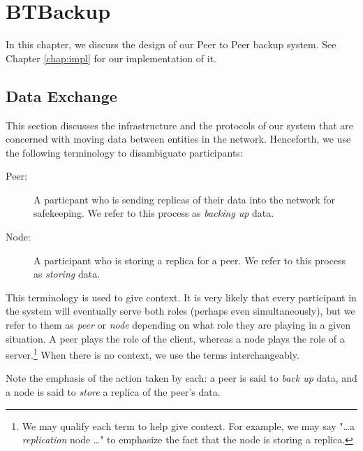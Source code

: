 \documentclass[12pt]{report}
\begin{document}
\chapter{BTBackup}

In this chapter, we discuss the design of our Peer to Peer backup system. See Chapter \ref{chap:impl} for our implementation of it.

\section{Data Exchange} \label{sec:DataExchange}

This section discusses the infrastructure and the protocols of our system that are concerned with moving data between entities in the network. Henceforth, we use the following terminology to disambiguate participants:

\begin{description}
  \item[Peer:] A particpant who is sending replicas of their data into the network for safekeeping. We refer to this process as \textit{backing up} data.
  \item[Node:] A participant who is storing a replica for a peer. We refer to this process as \textit{storing} data.
\end{description}

This terminology is used to give context. It is very likely that every participant in the system will eventually serve both roles (perhaps even simultaneously), but we refer to them as \textit{peer} or \textit{node} depending on what role they are playing in a given situation. A peer plays the role of the client, whereas a node plays the role of a server.\footnote{We may qualify each term to help give context. For example, we may say "\ldots a \textit{replication} node \ldots" to emphasize the fact that the node is storing a replica.} When there is no context, we use the terms interchangeably.

Note the emphasis of the action taken by each: a peer is said to \textit{back up} data, and a node is said to \textit{store} a replica of the peer's data.
\end{document}

